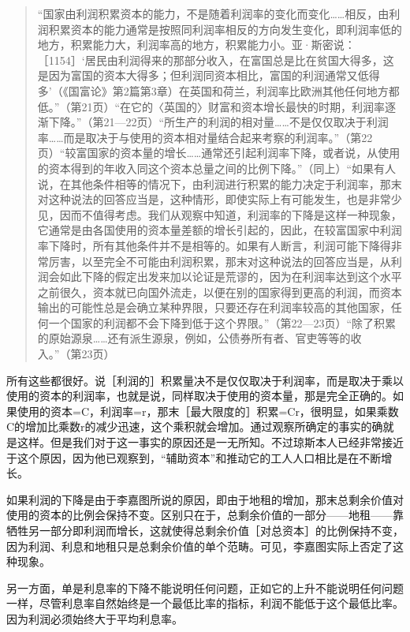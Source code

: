 \begin{quote}{“国家由利润积累资本的能力，不是随着利润率的变化而变化……相反，由利润积累资本的能力通常是按照同利润率相反的方向发生变化，即利润率低的地方，积累能力大，利润率高的地方，积累能力小。亚·斯密说：［1154］‘居民由利润得来的那部分收入，在富国总是比在贫国大得多，这是因为富国的资本大得多；但利润同资本相比，富国的利润通常又低得多’（《国富论》第2篇第3章）在英国和荷兰，利润率比欧洲其他任何地方都低。”（第21页）“在它的〈英国的〉财富和资本增长最快的时期，利润率逐渐下降。”（第21—22页）“所生产的利润的相对量……不是仅仅取决于利润率……而是取决于与使用的资本相对量结合起来考察的利润率。”（第22页）“较富国家的资本量的增长……通常还引起利润率下降，或者说，从使用的资本得到的年收入同这个资本总量之间的比例下降。”（同上）“如果有人说，在其他条件相等的情况下，由利润进行积累的能力决定于利润率，那末对这种说法的回答应当是，这种情形，即使实际上有可能发生，也是非常少见，因而不值得考虑。我们从观察中知道，利润率的下降是这样一种现象，它通常是由各国使用的资本量差额的增长引起的，因此，在较富国家中利润率下降时，所有其他条件并不是相等的。如果有人断言，利润可能下降得非常厉害，以至完全不可能由利润积累，那末对这种说法的回答应当是，从利润会如此下降的假定出发来加以论证是荒谬的，因为在利润率达到这个水平之前很久，资本就已向国外流走，以便在别的国家得到更高的利润，而资本输出的可能性总是会确立某种界限，只要还存在利润率较高的其他国家，任何一个国家的利润都不会下降到低于这个界限。”（第22—23页）“除了积累的原始源泉……还有派生源泉，例如，公债券所有者、官吏等等的收入。”（第23页）}\end{quote}

所有这些都很好。说［利润的］积累量决不是仅仅取决于利润率，而是取决于乘以使用的资本的利润率，也就是说，同样取决于使用的资本量，那是完全正确的。如果使用的资本=C，利润率=r，那末［最大限度的］积累=Cr，很明显，如果乘数C的增加比乘数r的减少迅速，这个乘积就会增加。通过观察所确定的事实的确就是这样。但是我们对于这一事实的原因还是一无所知。不过琼斯本人已经非常接近于这个原因，因为他已观察到，“辅助资本”和推动它的工人人口相比是在不断增长。

如果利润的下降是由于李嘉图所说的原因，即由于地租的增加，那末总剩余价值对使用的资本的比例会保持不变。区别只在于，总剩余价值的一部分——地租——靠牺牲另一部分即利润而增长，这就使得总剩余价值［对总资本］的比例保持不变，因为利润、利息和地租只是总剩余价值的单个范畴。可见，李嘉图实际上否定了这种现象。

另一方面，单是利息率的下降不能说明任何问题，正如它的上升不能说明任何问题一样，尽管利息率自然始终是一个最低比率的指标，利润不能低于这个最低比率。因为利润必须始终大于平均利息率。

